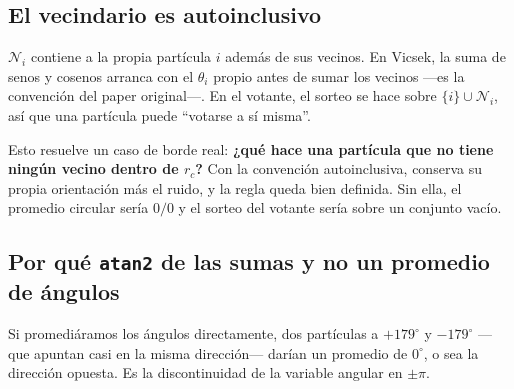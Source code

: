 \documentclass[11pt]{article}
\begin{document}

\subsection{El vecindario es autoinclusivo}

$\mathcal{N}_i$ contiene a la propia partícula $i$ además de sus vecinos. En
Vicsek, la suma de senos y cosenos arranca con el $\theta_i$ propio antes de
sumar los vecinos ---es la convención del paper original---. En el votante, el
sorteo se hace sobre $\{i\} \cup \mathcal{N}_i$, así que una partícula puede
``votarse a sí misma''.

Esto resuelve un caso de borde real: \textbf{¿qué hace una partícula que no
tiene ningún vecino dentro de $r_c$?} Con la convención autoinclusiva, conserva
su propia orientación más el ruido, y la regla queda bien definida. Sin ella,
el promedio circular sería $0/0$ y el sorteo del votante sería sobre un conjunto
vacío.



\subsection{Por qué \texttt{atan2} de las sumas y no un promedio de ángulos}

Si promediáramos los ángulos directamente, dos partículas a $+179^\circ$ y
$-179^\circ$ ---que apuntan casi en la misma dirección--- darían un promedio de
$0^\circ$, o sea la dirección opuesta. Es la discontinuidad de la variable
angular en $\pm\pi$.
\end{document}

